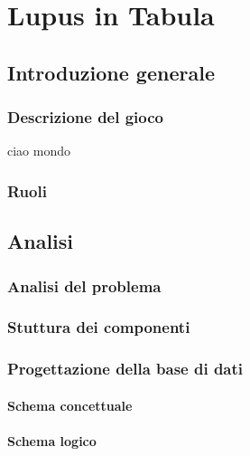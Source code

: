 \documentclass[b5paper,10pt,twoside,cucitura]{toptesi}
\begin{document}
\frontespizio

\sommario


\indici

\mainmatter

\part{Lupus in Tabula}


\chapter{Introduzione generale}

\section{Descrizione del gioco}
ciao mondo


\section{Ruoli}


\chapter{Analisi}

\section{Analisi del problema}


\section{Stuttura dei componenti}

\section{Progettazione della base di dati}
\subsection{Schema concettuale}
\subsection{Schema logico}
\end{document}
